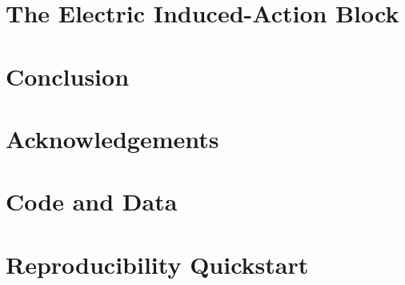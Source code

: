 \documentclass[12pt, letterpaper]{article}
\begin{document}
\section{The Electric Induced-Action Block}



\section{Conclusion}


\section*{Acknowledgements}


\appendix

\section{Code and Data}


\section{Reproducibility Quickstart}




\end{document}
